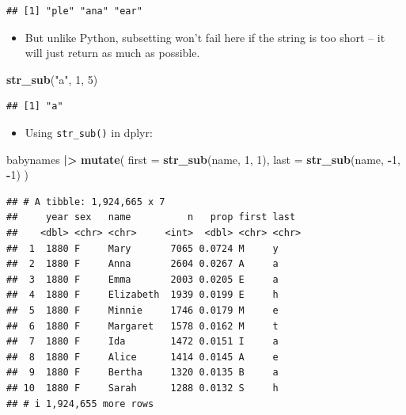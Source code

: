 \documentclass[
]{article}
\newenvironment{Shaded}{\begin{snugshade}}{\end{snugshade}}
\newcommand{\AttributeTok}[1]{\textcolor[rgb]{0.13,0.29,0.53}{#1}}
\newcommand{\DecValTok}[1]{\textcolor[rgb]{0.00,0.00,0.81}{#1}}
\newcommand{\FunctionTok}[1]{\textcolor[rgb]{0.13,0.29,0.53}{\textbf{#1}}}
\newcommand{\NormalTok}[1]{#1}
\newcommand{\SpecialCharTok}[1]{\textcolor[rgb]{0.81,0.36,0.00}{\textbf{#1}}}
\newcommand{\StringTok}[1]{\textcolor[rgb]{0.31,0.60,0.02}{#1}}
\providecommand{\tightlist}{%
  \setlength{\itemsep}{0pt}\setlength{\parskip}{0pt}}
\begin{document}
\begin{verbatim}
## [1] "ple" "ana" "ear"
\end{verbatim}

\begin{itemize}
\tightlist
\item
  But unlike Python, subsetting won't fail here if the string is too
  short -- it will just return as much as possible.
\end{itemize}

\begin{Shaded}
\begin{Highlighting}[]
\FunctionTok{str\_sub}\NormalTok{(}\StringTok{"a"}\NormalTok{, }\DecValTok{1}\NormalTok{, }\DecValTok{5}\NormalTok{)}
\end{Highlighting}
\end{Shaded}

\begin{verbatim}
## [1] "a"
\end{verbatim}

\begin{itemize}
\tightlist
\item
  Using \texttt{str\_sub()} in dplyr:
\end{itemize}

\begin{Shaded}
\begin{Highlighting}[]
\NormalTok{babynames }\SpecialCharTok{|\textgreater{}} 
  \FunctionTok{mutate}\NormalTok{(}
    \AttributeTok{first =} \FunctionTok{str\_sub}\NormalTok{(name, }\DecValTok{1}\NormalTok{, }\DecValTok{1}\NormalTok{),}
    \AttributeTok{last =} \FunctionTok{str\_sub}\NormalTok{(name, }\SpecialCharTok{{-}}\DecValTok{1}\NormalTok{, }\SpecialCharTok{{-}}\DecValTok{1}\NormalTok{)}
\NormalTok{  )}
\end{Highlighting}
\end{Shaded}

\begin{verbatim}
## # A tibble: 1,924,665 x 7
##     year sex   name          n   prop first last 
##    <dbl> <chr> <chr>     <int>  <dbl> <chr> <chr>
##  1  1880 F     Mary       7065 0.0724 M     y    
##  2  1880 F     Anna       2604 0.0267 A     a    
##  3  1880 F     Emma       2003 0.0205 E     a    
##  4  1880 F     Elizabeth  1939 0.0199 E     h    
##  5  1880 F     Minnie     1746 0.0179 M     e    
##  6  1880 F     Margaret   1578 0.0162 M     t    
##  7  1880 F     Ida        1472 0.0151 I     a    
##  8  1880 F     Alice      1414 0.0145 A     e    
##  9  1880 F     Bertha     1320 0.0135 B     a    
## 10  1880 F     Sarah      1288 0.0132 S     h    
## # i 1,924,655 more rows
\end{verbatim}
\end{document}
